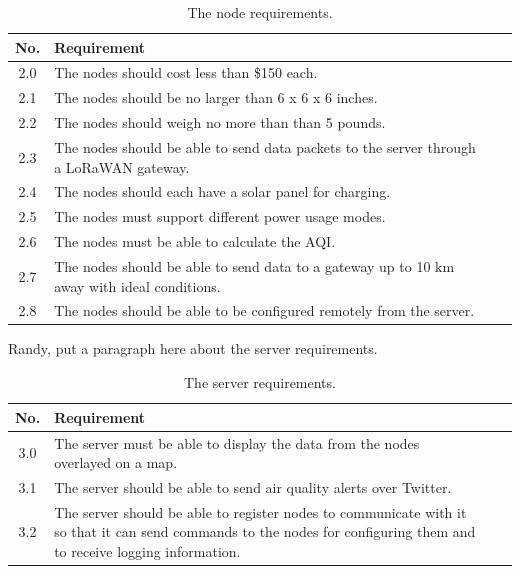 \begin{table}[H]
\centering
\caption{The node requirements.}
\begin{tabularx}{\linewidth}{|c|X|c|c|}
\hline
No. & Requirement \\
\hline\hline
2.0 & The nodes should cost less than \$150 each. \\\hline
2.1 & The nodes should be no larger than 6 x 6 x 6 inches. \\\hline
2.2 & The nodes should weigh no more than than 5 pounds. \\\hline
2.3 & The nodes should be able to send data packets to the server through a LoRaWAN gateway. \\\hline
2.4 & The nodes should each have a solar panel for charging. \\\hline
2.5 & The nodes must support different power usage modes. \\\hline
2.6 & The nodes must be able to calculate the AQI. \\\hline
2.7 & The nodes should be able to send data to a gateway up to 10 km away with ideal conditions. \\\hline
2.8 & The nodes should be able to be configured remotely from the server. \\\hline
\end{tabularx}
\label{tab:node-requirements}
\end{table}

Randy, put a paragraph here about the server requirements.

\begin{table}[H]
\centering
\caption{The server requirements.}
\begin{tabularx}{\linewidth}{|c|X|c|c|}
\hline
No. & Requirement \\
\hline\hline
3.0 & The server must be able to display the data from the nodes overlayed on a map. \\\hline
3.1 & The server should be able to send air quality alerts over Twitter. \\\hline
3.2 & The server should be able to register nodes to communicate with it so that it can send commands to the nodes for configuring them and to receive logging information. \\\hline
\end{tabularx}
\label{tab:server-requirements}
\end{table}




